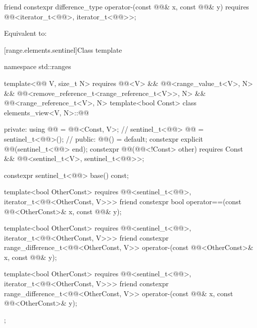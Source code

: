 %
\begin{itemdecl}
friend constexpr difference_type operator-(const @@& x, const @@& y)
  requires @@<iterator_t<@@>, iterator_t<@@>>;
\end{itemdecl}

\begin{itemdescr}
\pnum
\effects
Equivalent to: 
\end{itemdescr}

[range.elements.sentinel]{Class template }

%
\begin{codeblock}
namespace std::ranges {
  template<@@ V, size_t N>
    requires @@<V> && @@<range_value_t<V>, N> &&
             @@<remove_reference_t<range_reference_t<V>>, N> &&
             @@<range_reference_t<V>, N>
  template<bool Const>
  class elements_view<V, N>::@@ {
  private:
    using @@ = @@<Const, V>;                 // \expos
    sentinel_t<@@> @@ = sentinel_t<@@>();         // \expos
  public:
    @@() = default;
    constexpr explicit @@(sentinel_t<@@> end);
    constexpr @@(@@<!Const> other)
      requires Const && @@<sentinel_t<V>, sentinel_t<@@>>;

    constexpr sentinel_t<@@> base() const;

    template<bool OtherConst>
      requires @@<sentinel_t<@@>, iterator_t<@@<OtherConst, V>>>
    friend constexpr bool operator==(const @@<OtherConst>& x, const @@& y);

    template<bool OtherConst>
      requires @@<sentinel_t<@@>, iterator_t<@@<OtherConst, V>>>
    friend constexpr range_difference_t<@@<OtherConst, V>>
      operator-(const @@<OtherConst>& x, const @@& y);

    template<bool OtherConst>
      requires @@<sentinel_t<@@>, iterator_t<@@<OtherConst, V>>>
    friend constexpr range_difference_t<@@<OtherConst, V>>
      operator-(const @@& x, const @@<OtherConst>& y);
  };
}
\end{codeblock}


